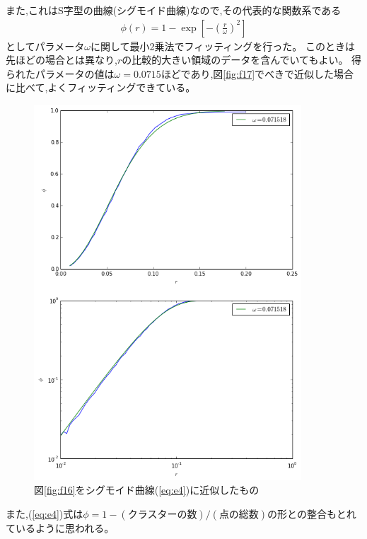 また,これはS字型の曲線(シグモイド曲線)なので,その代表的な関数系である
\begin{eqnarray}\phi (r) = 1 - \exp \left[ -  \left( \frac{r}{\omega} \right)^{2} \right]\label{eq:e4}
\end{eqnarray}
としてパラメータ$\omega$に関して最小2乗法でフィッティングを行った。
このときは先ほどの場合とは異なり,$r$の比較的大きい領域のデータを含んでいてもよい。
得られたパラメータの値は$\omega=0.0715$ほどであり,図\ref{fig:f17}でべきで近似した場合に比べて,よくフィッティングできている。
\begin{figure}[H]
    \begin{center}
        \includegraphics[width=10cm]{../img/r_phi_1_sigmoid.png}
        \caption{図\ref{fig:f16}をシグモイド曲線(\ref{eq:e4})に近似したもの}
        \label{fig:f18}
    \end{center}
\end{figure}
また,(\ref{eq:e4})式は$\phi = 1- (\text{クラスターの数})/(\text{点の総数})$の形との整合もとれているように思われる。

